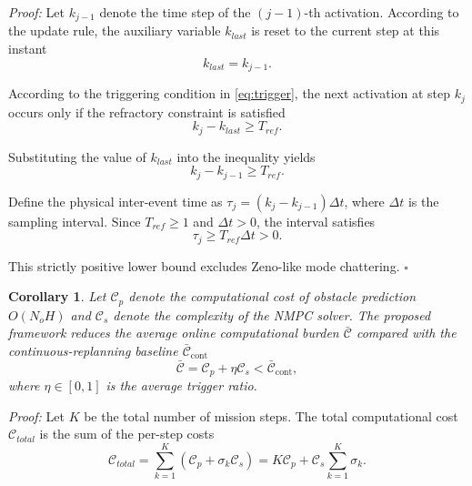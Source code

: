 \documentclass[lettersize,journal]{IEEEtran}
\newtheorem{corollary}{Corollary}
\begin{document}
\textit{Proof:} Let $k_{j-1}$ denote the time step of the $(j-1)$-th activation. According to the update rule, the auxiliary variable $k_{last}$ is reset to the current step at this instant
\begin{equation}
	k_{last} = k_{j-1}.
\end{equation}

According to the triggering condition in \eqref{eq:trigger}, the next activation at step $k_j$ occurs only if the refractory constraint is satisfied
\begin{equation}
	k_j - k_{last} \ge T_{ref}.
\end{equation}

Substituting the value of $k_{last}$ into the inequality yields
\begin{equation}
	k_j - k_{j-1} \ge T_{ref}.
\end{equation}

Define the physical inter-event time as $\tau_j = (k_j - k_{j-1})\Delta t$, where $\Delta t$ is the sampling interval. Since $T_{ref} \ge 1$ and $\Delta t > 0$, the interval satisfies
\begin{equation}
	\tau_j \ge T_{ref} \Delta t > 0.
\end{equation}

This strictly positive lower bound excludes Zeno-like mode chattering. \hfill $\square$

\begin{corollary}
	Let $\mathcal{C}_{p}$ denote the computational cost of obstacle prediction $O(N_o H)$ and $\mathcal{C}_{s}$ denote the complexity of the NMPC solver. The proposed framework reduces the average online computational burden $\bar{\mathcal{C}}$ compared with the continuous-replanning baseline $\bar{\mathcal{C}}_{\mathrm{cont}}$
	\begin{equation}
		\bar{\mathcal{C}} = \mathcal{C}_{p} + \eta \mathcal{C}_{s} < \bar{\mathcal{C}}_{\mathrm{cont}},
		\label{eq:efficiency_result}
	\end{equation}
	where $\eta \in [0,1]$ is the average trigger ratio.
\end{corollary}

\textit{Proof:} Let $K$ be the total number of mission steps. The total computational cost $\mathcal{C}_{total}$ is the sum of the per-step costs
\begin{equation}
	\mathcal{C}_{total} = \sum_{k=1}^{K} \left( \mathcal{C}_{p} + \sigma_k \mathcal{C}_{s} \right) = K \mathcal{C}_{p} + \mathcal{C}_{s} \sum_{k=1}^{K} \sigma_k.
\end{equation}
\end{document}
